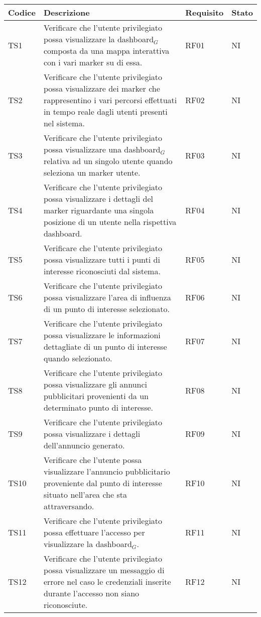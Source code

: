 \documentclass[10pt]{article}
\begin{document}
\begin{justify}
\begin{longtable}{|>{\centering\arraybackslash}m{2cm}|>{\centering\arraybackslash}m{7cm}|>{\centering\arraybackslash}m{2cm}|>{\centering\arraybackslash}m{2cm}|}
\hline
\textbf{Codice} & \textbf{Descrizione} & \textbf{Requisito} & \textbf{Stato}\\
\endhead
\hline
TS1 & Verificare che l'utente privilegiato possa visualizzare la dashboard$_G$ composta da una mappa interattiva con i vari marker su di essa. & RF01 & NI\\
\hline
TS2 & Verificare che l'utente privilegiato possa visualizzare dei marker che rappresentino i vari percorsi effettuati in tempo reale dagli utenti presenti nel sistema. & RF02 & NI\\
\hline
TS3 & Verificare che l'utente privilegiato possa visualizzare una dashboard$_G$ relativa ad un singolo utente quando seleziona un marker utente. & RF03 & NI\\
\hline
TS4 & Verificare che l'utente privilegiato possa visualizzare i dettagli del marker riguardante una singola posizione di un utente nella rispettiva dashboard. & RF04 & NI\\
\hline
TS5 & Verificare che l'utente privilegiato possa visualizzare tutti i punti di interesse riconosciuti dal sistema. & RF05 & NI\\
\hline
TS6 & Verificare che l'utente privilegiato possa visualizzare l'area di influenza di un punto di interesse selezionato. & RF06 & NI\\
\hline
TS7 & Verificare che l'utente privilegiato possa visualizzare le informazioni dettagliate di un punto di interesse quando selezionato. & RF07 & NI\\
\hline
TS8 & Verificare che l'utente privilegiato possa visualizzare gli annunci pubblicitari provenienti da un determinato punto di interesse. & RF08 & NI\\
\hline
TS9 & Verificare che l'utente privilegiato possa visualizzare i dettagli dell'annuncio generato. & RF09 & NI\\
\hline
TS10 & Verificare che l'utente possa visualizzare l'annuncio pubblicitario proveniente dal punto di interesse situato nell'area che sta attraversando. & RF10 & NI\\
\hline
TS11 & Verificare che l'utente privilegiato possa effettuare l'accesso per visualizzare la dashboard$_G$. & RF11 & NI\\
\hline
TS12 & Verificare che l'utente privilegiato possa visualizzare un messaggio di errore nel caso le credenziali inserite durante l'accesso non siano riconosciute. & RF12 & NI\\

\end{longtable}
\end{justify}
\end{document}
